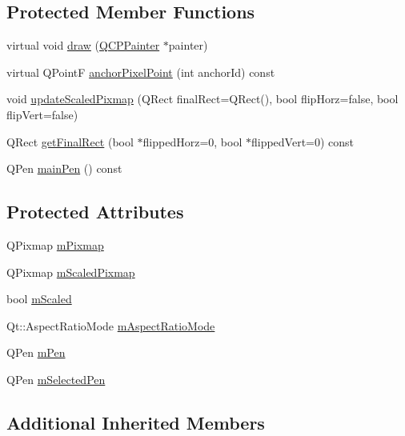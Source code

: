 \subsection*{Protected Member Functions}
\begin{DoxyCompactItemize}
\item 
virtual void \hyperlink{class_q_c_p_item_pixmap_a879e8076c2db01a38b34cfa73ec95d2f}{draw} (\hyperlink{class_q_c_p_painter}{Q\-C\-P\-Painter} $\ast$painter)
\item 
virtual Q\-Point\-F \hyperlink{class_q_c_p_item_pixmap_a88abce3c1027f371cddcf6dad35ffbb1}{anchor\-Pixel\-Point} (int anchor\-Id) const 
\item 
void \hyperlink{class_q_c_p_item_pixmap_a8bced3027b326b290726cd1979c7cfc6}{update\-Scaled\-Pixmap} (Q\-Rect final\-Rect=Q\-Rect(), bool flip\-Horz=false, bool flip\-Vert=false)
\item 
Q\-Rect \hyperlink{class_q_c_p_item_pixmap_a245ef0c626cab7096a810442f2f6a2d9}{get\-Final\-Rect} (bool $\ast$flipped\-Horz=0, bool $\ast$flipped\-Vert=0) const 
\item 
Q\-Pen \hyperlink{class_q_c_p_item_pixmap_af21085516585c475dc9d839e7f377233}{main\-Pen} () const 
\end{DoxyCompactItemize}
\subsection*{Protected Attributes}
\begin{DoxyCompactItemize}
\item 
Q\-Pixmap \hyperlink{class_q_c_p_item_pixmap_a1396cce7f26c7b8e9512906284380c4d}{m\-Pixmap}
\item 
Q\-Pixmap \hyperlink{class_q_c_p_item_pixmap_a2ebc66e15b9f1264563d58f29ba1bc00}{m\-Scaled\-Pixmap}
\item 
bool \hyperlink{class_q_c_p_item_pixmap_a8fe670a529cd46a9b8afd9fc1203bc3f}{m\-Scaled}
\item 
Qt\-::\-Aspect\-Ratio\-Mode \hyperlink{class_q_c_p_item_pixmap_a8dc6b6c1e106ac523efae22d5fe55bab}{m\-Aspect\-Ratio\-Mode}
\item 
Q\-Pen \hyperlink{class_q_c_p_item_pixmap_acfee1124eb51a1887aaf8de10777c7a1}{m\-Pen}
\item 
Q\-Pen \hyperlink{class_q_c_p_item_pixmap_a0949e5bb6a261fc4e9668e28e2effcfa}{m\-Selected\-Pen}
\end{DoxyCompactItemize}
\subsection*{Additional Inherited Members}


